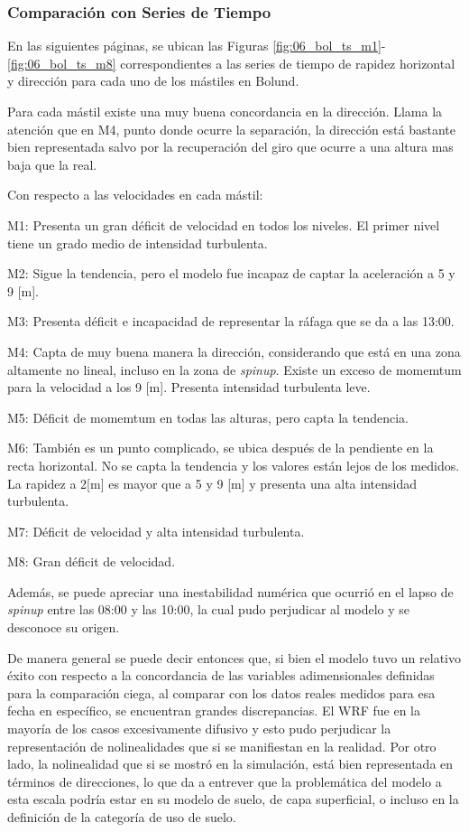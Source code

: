 \subsubsection{Comparación con Series de Tiempo}
En las siguientes páginas, se ubican las Figuras \ref{fig:06_bol_ts_m1}-\ref{fig:06_bol_ts_m8} correspondientes a las series de tiempo de rapidez horizontal y dirección para cada uno de los mástiles en Bolund. 

Para cada mástil existe una muy buena concordancia en la dirección. Llama la atención que en M4, punto donde ocurre la separación, la dirección está bastante bien representada salvo por la recuperación del giro que ocurre a una altura mas baja que la real. 

Con respecto a las velocidades en cada mástil:
\begin{itemize*}
	\item M1: Presenta un gran déficit de velocidad en todos los niveles. El primer nivel tiene un grado medio de intensidad turbulenta.
	\item M2: Sigue la tendencia, pero el modelo fue incapaz de captar la aceleración a 5 y 9 [m].
	\item M3: Presenta déficit e incapacidad de representar la ráfaga que se da a las 13:00.
	\item M4: Capta de muy buena manera la dirección, considerando que está en una zona altamente no lineal, incluso en la zona de \emph{spinup}. Existe un exceso de momemtum para la velocidad a los 9 [m]. Presenta intensidad turbulenta leve.
	\item M5: Déficit de momemtum en todas las alturas, pero capta la tendencia.
	\item M6: También es un punto complicado, se ubica después de la pendiente en la recta horizontal. No se capta la tendencia y los valores están lejos de los medidos. La rapidez a 2[m] es mayor que a 5 y 9 [m] y presenta una alta intensidad turbulenta.
	\item M7: Déficit de velocidad y alta intensidad turbulenta.
	\item M8: Gran déficit de velocidad.
\end{itemize*} 

Además, se puede apreciar una inestabilidad numérica que ocurrió en el lapso de \emph{spinup} entre las 08:00 y las 10:00, la cual pudo perjudicar al modelo y se desconoce su origen.

De manera general se puede decir entonces que, si bien el modelo tuvo un relativo éxito con respecto a la concordancia de las variables adimensionales definidas para la comparación ciega, al comparar con los datos reales medidos para esa fecha en específico, se encuentran grandes discrepancias. El WRF fue en la mayoría de los casos excesivamente difusivo y esto pudo perjudicar la representación de nolinealidades que si se manifiestan en la realidad. Por otro lado, la nolinealidad que si se mostró en la simulación, está bien representada en términos de direcciones, lo que da a entrever que la problemática del modelo a esta escala podría estar en su modelo de suelo, de capa superficial, o incluso en la definición de la categoría de uso de suelo.

